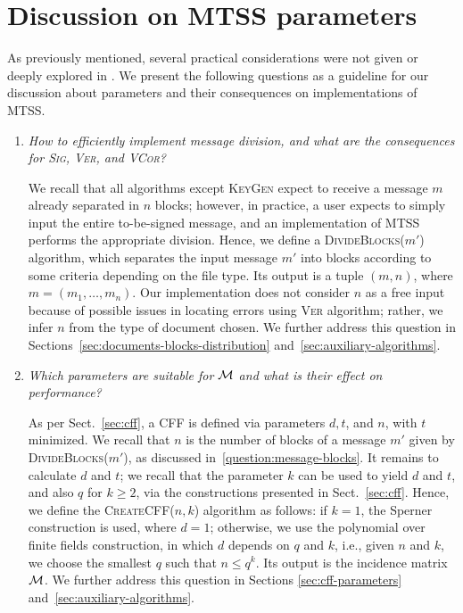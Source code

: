 \documentclass[12pt]{article}
\begin{document}
\section{Discussion on MTSS parameters}
\label{sec:discussion-mtss-parameters}

As previously mentioned, several practical considerations were not given or deeply explored in \cite{mtss-idalino-2019}. We present the following questions as a guideline for our discussion about parameters and their consequences on implementations of MTSS.

\begin{enumerate}[label=$\mathbf{Q_{\arabic*}}$, itemsep=.5em, wide, labelindent=0pt, listparindent=0pt]
  \item\label{question:message-blocks}
  
  \emph{How to efficiently implement message division, and what are the consequences for \textsc{Sig}, \textsc{Ver}, and \textsc{VCor}?} 
  
  \vspace{.5em}
  We recall that all algorithms except \textsc{KeyGen} expect to receive a message $m$ already separated in $n$ blocks; however, in practice, a user expects to simply input the entire to-be-signed message, and an implementation of MTSS performs the appropriate division. Hence, we define a \textsc{DivideBlocks($m'$)} algorithm, which separates the input message $m'$ into blocks according to some criteria depending on the file type. Its output is a tuple $(m, n)$, where $m = (m_{1}, \dots, m_{n})$. Our implementation does not consider $n$ as a free input because of possible issues in locating errors using \textsc{Ver} algorithm; rather, we infer $n$ from the type of document chosen. We further address this question in Sections~\ref{sec:documents-blocks-distribution} and~\ref{sec:auxiliary-algorithms}.

  \item\label{question:cff-parameters}

  \emph{Which parameters are suitable for $\mathcal{M}$ and what is their effect on performance?} 
  
  \vspace{.5em}
  As per Sect.~\ref{sec:cff}, a CFF is defined via parameters $d, t$, and $n$, with $t$ minimized. We recall that $n$ is the number of blocks of a message $m'$ given by \textsc{DivideBlocks}($m'$), as discussed in~\ref{question:message-blocks}. It remains to calculate $d$ and $t$; we recall that the parameter $k$ can be used to yield $d$ and $t$, and also $q$ for $k \geq 2$, via the constructions presented in Sect.~\ref{sec:cff}. Hence, we define the \textsc{CreateCFF($n, k$)} algorithm as follows: if $k = 1$, the Sperner construction is used, where $d = 1$; otherwise, we use the polynomial over finite fields construction, in which $d$ depends on $q$ and $k$, i.e., given $n$ and $k$, we choose the smallest $q$ such that $n \leq q^k$. Its output is the incidence matrix $\mathcal{M}$. We further address this question in Sections \ref{sec:cff-parameters} and~\ref{sec:auxiliary-algorithms}.


\end{enumerate}
\end{document}
